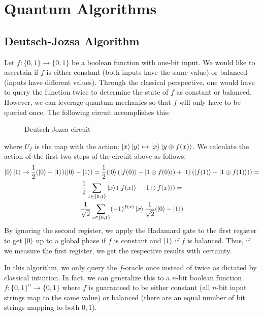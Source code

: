 \documentclass{../quantum.tex}
\begin{document}
\section{Quantum Algorithms}

\subsection{Deutsch-Jozsa Algorithm}

Let $f: \{0,1\} \rightarrow \{0,1\}$ be a boolean function with one-bit input. We would like to ascertain if $f$ is either constant (both inputs have the same value) or balanced (inputs have different values). Through the classical perspective, one would have to query the function twice to determine the state of $f$ as constant or balanced. However, we can leverage quantum mechanics so that $f$ will only have to be queried once.
%
The following circuit accomplishes this:

\begin{figure}[ht]
    \centering
    \leavevmode
    \caption{Deutsch-Jozsa circuit}
\end{figure}
%
where $U_f$ is the map with the action: $\ket{x}\ket{y} \mapsto \ket{x}\ket{y \oplus f(x)}$. We calculate the action of the first two steps of the circuit above as follows:
%
\begin{gather}
  \ket{0}\ket{1} \rightarrow \frac{1}{2}(\ket{0} + \ket{1})(\ket{0} - \ket{1}) = \frac{1}{2}(\ket{0}(\ket{f(0)} - \ket{1 \oplus f(0)}) + \ket{1}(\ket{f(1)} - \ket{1 \oplus f(1)})) = \\
  \frac{1}{2}\sum_{x \in \{0,1\}} \ket{x}(\ket{f(x)} - \ket{1 \oplus f(x)}) = \\
  \frac{1}{\sqrt{2}} \sum_{x \in \{0,1\}} (-1)^{f(x)}\ket{x} \frac{1}{\sqrt{2}}(\ket{0} -
  \ket{1})
\end{gather}
By ignoring the second register, we apply the Hadamard gate to the first register to get $\ket{0}$ up to a global phase if $f$ is constant and $\ket{1}$ if $f$ is balanced. Thus, if we measure the first register, we get the respective results with certainty.

In this algorithm, we only query the $f$-oracle once instead of twice as dictated by classical intuition. In fact, we can generalize this to a $n$-bit boolean function $f:\{0,1\}^n \rightarrow \{0,1\}$ where $f$ is guaranteed to be either constant (all $n$-bit input strings map to the same value) or balanced (there are an equal number of bit strings mapping to both $0,1$).
\end{document}
